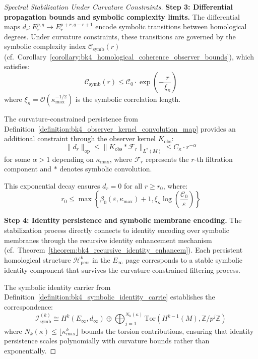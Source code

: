 \begin{proof}[Spectral Stabilization Under Curvature Constraints]
\textbf{Step 3: Differential propagation bounds and symbolic complexity limits.}
The differential maps $d_r: E_r^{p,q} \to E_r^{p+r,q-r+1}$ encode symbolic transitions between homological degrees. Under curvature constraints, these transitions are governed by the symbolic complexity index $\mathcal{C}_{\text{symb}}(r)$ (cf.~Corollary~\ref{corollary:bk4_homological_coherence_observer_bounds}), which satisfies:
\begin{equation}
\mathcal{C}_{\text{symb}}(r) \leq \mathcal{C}_0 \cdot \exp\left(-\frac{r}{\xi_{\kappa}}\right)
\end{equation}
where $\xi_{\kappa} = \mathcal{O}(\kappa_{\max}^{-1/2})$ is the symbolic correlation length.

The curvature-constrained persistence from Definition~\ref{definition:bk4_observer_kernel_convolution_map} provides an additional constraint through the observer kernel $K_{\text{obs}}$:
\begin{equation}
\|d_r\|_{\text{op}} \leq \|K_{\text{obs}} * \mathcal{F}_r\|_{L^2(M)} \leq C_{\kappa} \cdot r^{-\alpha}
\end{equation}
for some $\alpha > 1$ depending on $\kappa_{\max}$, where $\mathcal{F}_r$ represents the $r$-th filtration component and $*$ denotes symbolic convolution.

This exponential decay ensures $d_r = 0$ for all $r \geq r_0$, where:
\begin{equation}
r_0 \leq \max\left\{\beta_0(\varepsilon, \kappa_{\max}) + 1, \xi_{\kappa} \log\left(\frac{\mathcal{C}_0}{\varepsilon}\right)\right\}
\end{equation}

\textbf{Step 4: Identity persistence and symbolic membrane encoding.}
The stabilization process directly connects to identity encoding over symbolic membranes through the recursive identity enhancement mechanism (cf.~Theorem~\ref{theorem:bk4_recursive_identity_enhancem}). Each persistent homological structure $\mathcal{H}_{\text{pers}}^k$ in the $E_\infty$ page corresponds to a stable symbolic identity component that survives the curvature-constrained filtering process.

The symbolic identity carrier from Definition~\ref{definition:bk4_symbolic_identity_carrie} establishes the correspondence:
\begin{equation}
\mathcal{I}_{\text{symb}}^{(k)} \cong H^k(E_\infty, d_\infty) \oplus \bigoplus_{j=1}^{N_k(\kappa)} \text{Tor}(H^{k-1}(M), \mathbb{Z}/p^j\mathbb{Z})
\end{equation}
where $N_k(\kappa) \leq \lfloor \kappa_{\max}^k \rfloor$ bounds the torsion contributions, ensuring that identity persistence scales polynomially with curvature bounds rather than exponentially.


\end{proof}
